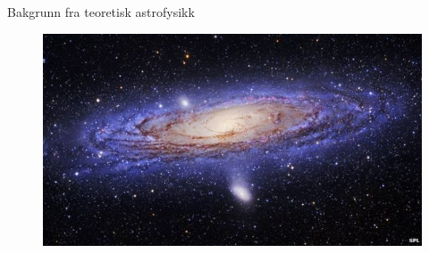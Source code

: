 \documentclass[presentation]{beamer}
\begin{document}
\begin{frame}{Bakgrunn fra teoretisk astrofysikk}
   \begin{figure}
       {\includegraphics[width=1\textwidth]{galaxy.jpg}}
\end{figure}
\end{frame}
\end{document}
